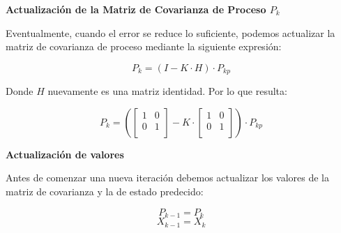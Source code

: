 \textbf{Actualización de la Matriz de Covarianza de Proceso $P_k$} \mbox{} \vspace{8pt}

Eventualmente, cuando el error se reduce lo suficiente, podemos actualizar la matriz de covarianza de proceso mediante la siguiente expresión:

$$ P_k = ( I - K \cdot H ) \cdot P_{kp} $$

Donde $H$ nuevamente es una matriz identidad. Por lo que resulta:

$$ P_k =
    (
    \begin{bmatrix}
    1 & 0 \\
    0 & 1  \\
    \end{bmatrix}
    -
    K
    \cdot
    \begin{bmatrix}
    1 & 0 \\
    0 & 1  \\
    \end{bmatrix}
    )
    \cdot
    P_{kp}
$$

\textbf{Actualización de valores} \mbox{} \vspace{8pt}

Antes de comenzar una nueva iteración debemos actualizar los valores de la matriz de covarianza y la de estado predecido:

$$ P_{k-1} = P_k $$
$$ X_{k-1} = X_k $$